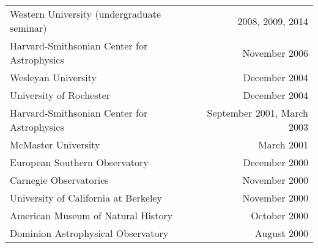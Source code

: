 \documentclass[12pt]{article}
\begin{document}
\begin{tabularx}{\textwidth}{Xr}
Western University (undergraduate seminar)& 2008, 2009, 2014\\
Harvard-Smithsonian Center for Astrophysics& November 2006\\
Wesleyan University& December 2004\\
University of Rochester& December 2004\\
Harvard-Smithsonian Center for Astrophysics& September 2001, March 2003\\
McMaster University& March 2001\\
European Southern Observatory& December 2000\\
Carnegie Observatories& November 2000\\
University of California at Berkeley& November 2000\\
American Museum of Natural History& October 2000\\
Dominion Astrophysical Observatory& August 2000\\
\end{tabularx}

\clearpage

\begin{publications}

\printbibliography[title={Submitted refereed publications},keyword=submit]

\printbibliography[title={Refereed publications},keyword=ref]

\setcounter{papers}{0}
\printbibliography[title={Conference presentations},keyword=unref]


\end{publications}
\end{document}
